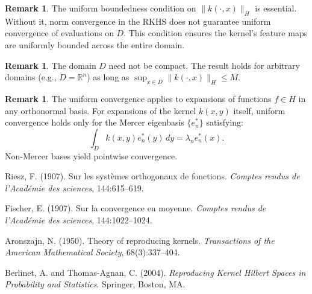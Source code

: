 \documentclass{article}
\theoremstyle{definition}
\newtheorem{remark}[theorem]{Remark}
\begin{document}
\begin{remark}
The uniform boundedness condition on $\|k(\cdot, x)\|_H$ is essential. Without it, norm convergence in the RKHS does not guarantee uniform convergence of evaluations on $D$. This condition ensures the kernel's feature maps are uniformly bounded across the entire domain.
\end{remark}

\begin{remark}
The domain $D$ need not be compact. The result holds for arbitrary domains (e.g., $D = \mathbb{R}^n$) as long as $\sup_{x \in D} \|k(\cdot, x)\|_H \le M$.
\end{remark}

\begin{remark} \label{rem:mercer_uniqueness}
The uniform convergence applies to expansions of functions $f \in H$ in any orthonormal basis. For expansions of the kernel $k(x, y)$ itself, uniform convergence holds only for the Mercer eigenbasis $\{e_n^*\}$ satisfying:
\[
\int_D k(x, y)e_n^*(y)\,dy = \lambda_n e_n^*(x).
\]
Non-Mercer bases yield pointwise convergence.
\end{remark}


\begin{thebibliography}{9}

Riesz, F. (1907). Sur les syst{\`e}mes orthogonaux de fonctions. \emph{Comptes rendus de l'Acad{\'e}mie des sciences}, 144:615--619.

Fischer, E. (1907). Sur la convergence en moyenne. \emph{Comptes rendus de l'Acad{\'e}mie des sciences}, 144:1022--1024.

Aronszajn, N. (1950). Theory of reproducing kernels. \emph{Transactions of the American Mathematical Society}, 68(3):337--404.

Berlinet, A. and Thomas-Agnan, C. (2004). \emph{Reproducing Kernel Hilbert Spaces in Probability and Statistics}. Springer, Boston, MA.

\end{thebibliography}
\end{document}
